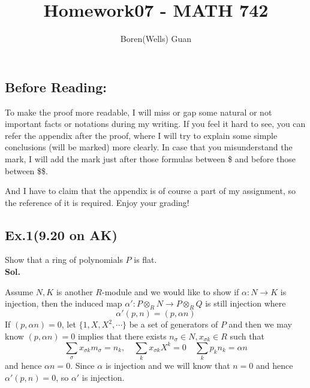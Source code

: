 \documentclass[lang=en,11pt,a4paper,citestyle =authoryear]{elegantpaper}
\title{Homework07 - MATH 742}
\author{Boren(Wells) Guan}
\begin{document}
\maketitle

\subsection*{Before Reading:}\par
To make the proof more readable, I will miss or gap some natural or not important facts or notations during my writing. If you feel it hard to see, you can refer the appendix after the proof, where I will try to explain some simple conclusions (will be marked) more clearly. In case that you misunderstand the mark, I will add the mark just after those formulas between \$ and before those between \$\$.\par
And I have to claim that the appendix is of course a part of my assignment, so the reference of it is required. Enjoy your grading!

\subsection*{Ex.1(9.20 on AK)} 
Show that a ring of polynomials $P$ is flat.
\vspace{0.5em}\\
\textbf{Sol.} \par
    Assume $N,K$ is another $R$-module and we would like to show if $\alpha:N\to K$ is injection, then the induced map $\alpha':P\otimes_R N \to P\otimes_R Q$ is still injection where
    \[
    \alpha'(p,n) = (p,\alpha n)
    \]
    If $(p,\alpha n) = 0$, let $\{1,X,X^2,\cdots\}$ be a set of generators of $P$ and then we may know $(p,\alpha n) = 0$ implies that there exists $n_{\sigma} \in N, x_{\sigma k}\in R$ such that
    \[
    \sum_{\sigma} x_{\sigma k}m_{\sigma} = n_{k}, \quad \sum_k x_{\sigma k}X^k = 0 \quad
    \sum_k p_{k}n_k = \alpha n
    \]
    and hence $\alpha n =0$. Since $\alpha$ is injection and we will know that $n=0$ and hence $\alpha'(p,n) = 0$, so $\alpha'$ is injection. 
\par 
\vspace{0.5em}
\end{document}

